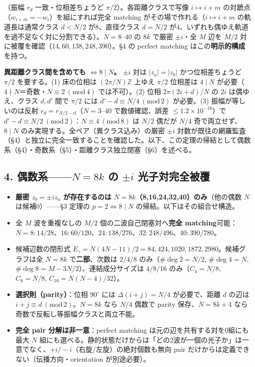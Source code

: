 \documentclass[
  a4paper,
]{ltjsarticle}
\providecommand{\tightlist}{%
  \setlength{\itemsep}{0pt}\setlength{\parskip}{0pt}}
\begin{document}
（振幅 \(r_d\) 一致・位相差ちょうど \(\pi/2\)）。各距離クラスで写像
\(i\mapsto i+m\) の対蹠点（\(w_{i+m}=-w_i\)）を組にすれば完全 matching
がその場で作れる（\(i\mapsto i+m\) の軌道長は通常クラス \(d<N/2\)
が8、直径クラス \(d=N/2\)
が4、いずれも偶ゆえ軌道を過不足なく対に分割できる）。\(N=8\)--\(40\) の
\(8k\) で厳密 \(\pm i\)・全 \(M\) 辺を \(M/2\)
対に被覆を確認（\(14,60,138,248,390\)）。§4 の perfect matching
はこの\textbf{明示的構成}を持つ。

\textbf{異距離クラス間を含めても \(\iff 8\mid N\)。} \(\pm i\) 対は
\(|z_a|=|z_b|\) かつ位相差ちょうど \(\pi/2\) を要する。(1) 床の位相は
\((2\pi/N)\mathbb Z\) 上ゆえ \(\pi/2\) 位相差は \(4\mid N\)
が必要（\(4\nmid N\)＝奇数・\(N\equiv2\ (\mathrm{mod}\,4)\)
では不可）。(2) 位相 \(2\pi(2i+d)/N\) の \(2i\) は偶ゆえ、クラス
\(d,d'\) 間で \(\pi/2\) には \(d'-d\equiv N/4\ (\mathrm{mod}\,2)\)
が必要。(3) 振幅が等しいのは反射 \(r_d=r_{N/2-d}\)（\(N=3\)--\(40\)
で数値確認、誤差 \(\le1.2\times10^{-16}\)）で
\(d'-d\equiv N/2\ (\mathrm{mod}\,2)\)：\(N\equiv4\ (\mathrm{mod}\,8)\)
は \(N/2\) 偶だが \(N/4\) 奇で両立せず、\(8\mid N\)
のみ実現する。全ペア（異クラス込み）の厳密 \(\pm i\)
対数が既往の網羅監査（§4）と独立に完全一致することを確認した。以下、この定理の帰結として偶数系（§4）・奇数系（§5）・距離クラス独立閉塞（§6）を述べる。

\subsection{\texorpdfstring{4. 偶数系------\(N=8k\) の \(\pm i\)
光子対完全被覆}{4. 偶数系------N=8k の \textbackslash pm i 光子対完全被覆}}\label{ux5076ux6570ux7cfbn8k-ux306e-pm-i-ux5149ux5b50ux5bfeux5b8cux5168ux88abux8986}

\begin{itemize}
\tightlist
\item
  \textbf{厳密 \(z_b=\pm i z_a\) が存在するのは
  \(N=8k\)（8,16,24,32,40）のみ}（他の偶数 \(N\) は候補0）------§3
  定理の \(p=2\iff8\mid N\) の帰結。以下はその組合せ構造。
\item
  全 \(M\) 波を重複なしの \(M/2\) 個の二波自己閉塞対へ\textbf{完全
  matching}可能：\(N=8{:}14/28\)、\(16{:}60/120\)、\(24{:}138/276\)、\(32{:}248/496\)、\(40{:}390/780\)。
\item
  候補辺数の閉形式
  \(E_\gamma=N(4N-11)/2=84,424,1020,1872,2980\)。候補グラフは全 \(N=8k\)
  で\textbf{二部}、次数は \(2/4/8\) のみ（\(\#\deg2=N/2\),
  \(\#\deg4=N\), \(\#\deg8=M-3N/2\)）、連結成分サイズは \(4/8/16\)
  のみ（\(C_4=N/8\), \(C_8=N/8\), \(C_{16}=N(N-4)/32\)）。
\item
  \textbf{選択則（parity）}：位相 \(90^\circ\) には \(\Delta(i+j)=N/4\)
  が必要で、距離 \(d\) の辺は
  \(i+j\equiv d\ (\mathrm{mod}\,2)\)。\(N=8k\) なら \(N/4\) 偶数で
  parity 保存、\(N=8k+4\) なら奇数で反転し等振幅クラスと両立不能。
\item
  \textbf{完全 pair 分解は非一意}：perfect matching
  は元の辺を共有する対を0組にも最大 \(N\)
  組にも選べる。静的状態だけからは「どの2波が一個の光子か」は一意でなく、\(+i/-i\)（右旋/左旋）の絶対個数も無向
  pair だけからは定義できない（伝播方向・orientation が別途必要）。
\end{itemize}
\end{document}
